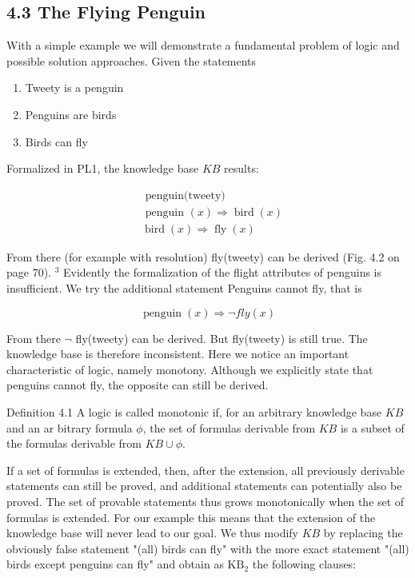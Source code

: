 \documentclass[10pt]{article}
\begin{document}
\subsection*{4.3 The Flying Penguin}
With a simple example we will demonstrate a fundamental problem of logic and possible solution approaches. Given the statements

\begin{enumerate}
  \item Tweety is a penguin
  \item Penguins are birds
  \item Birds can fly
\end{enumerate}

Formalized in PL1, the knowledge base $K B$ results:

$$
\begin{aligned}
& \text { penguin(tweety) } \\
& \text { penguin }(x) \Rightarrow \operatorname{bird}(x) \\
& \operatorname{bird}(x) \Rightarrow \operatorname{fly}(x)
\end{aligned}
$$

From there (for example with resolution) fly(tweety) can be derived (Fig. 4.2 on page 70). ${ }^{3}$ Evidently the formalization of the flight attributes of penguins is insufficient. We try the additional statement Penguins cannot fly, that is

$$
\operatorname{penguin}(x) \Rightarrow \neg f l y(x)
$$

From there $\neg$ fly(tweety) can be derived. But fly(tweety) is still true. The knowledge base is therefore inconsistent. Here we notice an important characteristic of logic, namely monotony. Although we explicitly state that penguins cannot fly, the opposite can still be derived.

Definition 4.1 A logic is called monotonic if, for an arbitrary knowledge base $K B$ and an ar
bitrary formula $\phi$, the set of formulas derivable from $K B$ is a subset of the formulas derivable from $K B \cup \phi$.

If a set of formulas is extended, then, after the extension, all previously derivable statements can still be proved, and additional statements can potentially also be proved. The set of provable statements thus grows monotonically when the set of formulas is extended. For our example this means that the extension of the knowledge base will never lead to our goal. We thus modify $K B$ by replacing the obviously false statement "(all) birds can fly" with the more exact statement "(all) birds except penguins can fly" and obtain as $\mathrm{KB}_{2}$ the following clauses:
\end{document}
